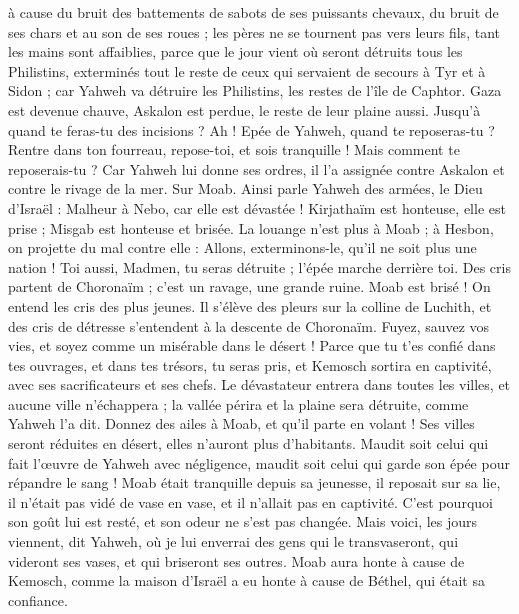 \begin{multicols}{2}
à cause du bruit des battements de sabots de ses puissants chevaux, du bruit de ses chars et au son de ses roues ; les pères ne se tournent pas vers leurs fils, tant les mains sont affaiblies,
parce que le jour vient où seront détruits tous les Philistins, exterminés tout le reste de ceux qui servaient de secours à Tyr et à Sidon ; car Yahweh va détruire les Philistins, les restes de l'île de Caphtor.
Gaza est devenue chauve, Askalon est perdue, le reste de leur plaine aussi. Jusqu’à quand te feras-tu des incisions ?
Ah ! Epée de Yahweh, quand te reposeras-tu ? Rentre dans ton fourreau, repose-toi, et sois tranquille !
Mais comment te reposerais-tu ? Car Yahweh lui donne ses ordres, il l'a assignée contre Askalon et contre le rivage de la mer.
\VerseOne{}Sur Moab. Ainsi parle Yahweh des armées, le Dieu d'Israël : Malheur à Nebo, car elle est dévastée ! Kirjathaïm est honteuse, elle est prise ; Misgab est honteuse et brisée.
La louange n'est plus à Moab ; à Hesbon, on projette du mal contre elle : Allons, exterminons-le, qu'il ne soit plus une nation ! Toi aussi, Madmen, tu seras détruite ; l'épée marche derrière toi.
Des cris partent de Choronaïm ; c'est un ravage, une grande ruine.
Moab est brisé ! On entend les cris des plus jeunes.
Il s'élève des pleurs sur la colline de Luchith, et des cris de détresse s'entendent à la descente de Choronaïm.
Fuyez, sauvez vos vies, et soyez comme un misérable dans le désert !
Parce que tu t'es confié dans tes ouvrages, et dans tes trésors, tu seras pris, et Kemosch sortira en captivité, avec ses sacrificateurs et ses chefs.
Le dévastateur entrera dans toutes les villes, et aucune ville n'échappera ; la vallée périra et la plaine sera détruite, comme Yahweh l’a dit.
Donnez des ailes à Moab, et qu'il parte en volant ! Ses villes seront réduites en désert, elles n'auront plus d'habitants.
Maudit soit celui qui fait l'œuvre de Yahweh avec négligence, maudit soit celui qui garde son épée pour répandre le sang !
Moab était tranquille depuis sa jeunesse, il reposait sur sa lie, il n'était pas vidé de vase en vase, et il n'allait pas en captivité. C'est pourquoi son goût lui est resté, et son odeur ne s'est pas changée.
Mais voici, les jours viennent, dit Yahweh, où je lui enverrai des gens qui le transvaseront, qui videront ses vases, et qui briseront ses outres.
Moab aura honte à cause de Kemosch, comme la maison d'Israël a eu honte à cause de Béthel, qui était sa confiance.

\end{multicols}
